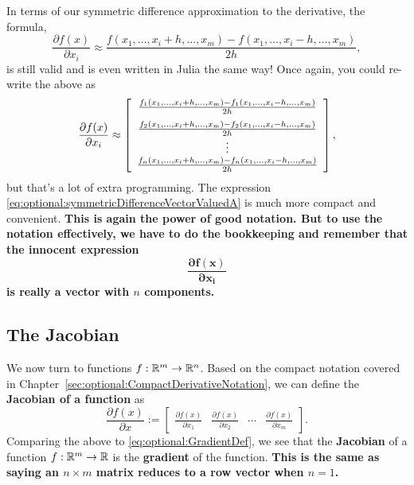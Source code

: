 In terms of our symmetric difference approximation to the derivative, the formula,
\begin{equation}
\label{eq:optional:symmetricDifferenceVectorValuedA}
     \frac{\partial f(x)}{\partial x_i}\approx \frac{f(x_1, \ldots, x_i+h, \ldots, x_m) - f(x_1, \ldots, x_i-h, \ldots, x_m)}{2h},
\end{equation}
is still valid and is even written in Julia the same way! Once again, you could re-write the above as
\begin{equation}
\label{eq:optional:symmetricDifferenceVectorValuedB}
  \frac{\partial f(x)}{\partial x_i}\approx \left[\begin{array}{c}
     \frac{f_1(x_1, \ldots, x_i+h, \ldots, x_m) - f_1(x_1, \ldots, x_i-h, \ldots, x_m)}{2h} \medskip \\
      \frac{f_2(x_1, \ldots, x_i+h, \ldots, x_m) - f_2(x_1, \ldots, x_i-h, \ldots, x_m)}{2h}\\
       \vdots\\
      \frac{f_n(x_1, \ldots, x_i+h, \ldots, x_m) - f_n(x_1, \ldots, x_i-h, \ldots, x_m)}{2h}
    \end{array} \right],
\end{equation}
 but that's a lot of extra programming. The expression \eqref{eq:optional:symmetricDifferenceVectorValuedA} is much more compact and convenient. \textbf{This is again the power of good notation. But to use the notation effectively, we have to do the bookkeeping and remember that the innocent expression 
 $$\mathbf{ \frac{\partial f(x)}{\partial x_i} }$$
 is really a vector with $n$ components.} 



\subsection{The Jacobian}

We now turn to functions $f:\mathbb R^m \to \mathbb R^n$. Based on the compact notation covered in Chapter~\ref{sec:optional:CompactDerivativeNotation}, we can define the \textbf{Jacobian of a function} as
\begin{equation}
    \label{eq:optional:DefJacobian}
    \frac{\partial f(x)}{\partial x}:=  \left[\begin{array}{cccc}
      \frac{\partial f(x)}{\partial x_1} & \frac{\partial f(x)}{\partial x_2} & \cdots & \frac{\partial f(x)}{\partial x_m}
    \end{array} \right].
\end{equation}
Comparing the above to \eqref{eq:optional:GradientDef}, we see that the \textbf{Jacobian} of a function $f:\mathbb R^m \to \mathbb R$ is the \textbf{gradient} of the function. \textbf{This is the same as saying an $n \times m$ matrix reduces to a row vector when $n=1$. } \\

